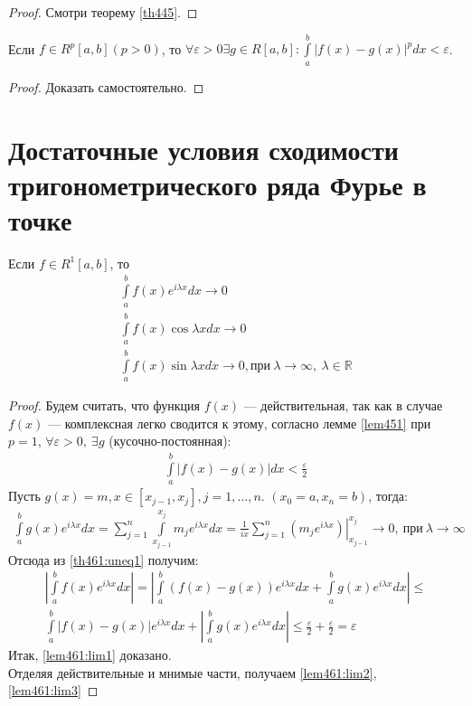 \begin{proof}
  Смотри теорему \eqref{th445}.
\end{proof}

\begin{lemma}
  \label{lem451}
  Если $f \in R^p[a,b] (p > 0)$, то $\forall \varepsilon > 0 \exists g \in
  R[a,b]: \int\limits_a^b |f(x) - g(x)|^p dx < \varepsilon$.
\end{lemma}

\begin{proof}
  Доказать самостоятельно.
\end{proof}

\section{Достаточные условия сходимости тригонометрического ряда Фурье в точке}
\begin{lemma}[Римана]
  Если $f \in R^1[a,b]$, то
  \begin{gather}
    \int\limits_a^b f(x) e^{i\lambda x} dx \to 0
    \label{lem461:lim1} \\
    \int\limits_a^b f(x) \cos \lambda x dx \to 0
    \label{lem461:lim2} \\
    \int\limits_a^b f(x) \sin \lambda x dx \to 0, \text{при} \ \lambda \to
    \infty, \ \lambda \in \mathbb{R}
    \label{lem461:lim3}
  \end{gather}
\end{lemma}

\begin{proof}
  Будем считать, что функция $f(x)$ --- действительная, так как в случае $f(x)$
  --- комплексная легко сводится к этому, согласно лемме \eqref{lem451} при $p
  = 1$, $\forall \varepsilon > 0, \ \exists g$ (кусочно-постоянная):
  \begin{gather}
    \int\limits_a^b |f(x) - g(x)| dx < \frac{\varepsilon}{2}
    \label{th461:uneq1}
  \end{gather}
  Пусть $g(x) = m, x \in [x_{j-1}, x_j], j = 1, \dots, n$. $(x_0 = a, x_n =
  b)$, тогда:
  \begin{gather*}
    \int\limits_a^b g(x) e^{i\lambda x} dx = \sum\limits_{j = 1}^{n}
    \int\limits_{x_{j-1}}^{x_j} m_j e^{i\lambda x} dx = \left. \frac{1}{ix}
    \sum\limits_{j = 1}^{n} (m_j e^{i \lambda x})
    \right |_{x_{j-1}}^{x_j} \to 0, \ \text{при} \ \lambda \to \infty
  \end{gather*}
  Отсюда из \eqref{th461:uneq1} получим: \\
  \begin{gather*}
    \left| \int\limits_a^b f(x) e^{i\lambda x} dx \right| =
    \left| \int\limits_a^b (f(x) - g(x)) e^{i\lambda x} dx +
    \int\limits_a^b g(x) e^{i\lambda x} dx \right| \leq \\
    \int\limits_a^b |f(x) - g(x)| e^{i\lambda x} dx +
    \left| \int\limits_a^b g(x) e^{i\lambda x} dx \right| \leq
    \frac{\varepsilon}{2} + \frac{\varepsilon}{2} = \varepsilon
  \end{gather*}
  Итак, \eqref{lem461:lim1} доказано. \\
  Отделяя действительные и мнимые части, получаем \eqref{lem461:lim2},
  \eqref{lem461:lim3}
\end{proof}

